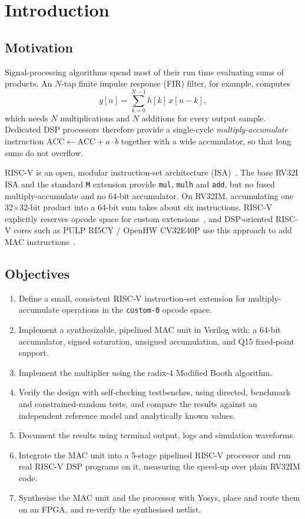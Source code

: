 \documentclass[11pt,a4paper]{report}
\newcommand{\code}[1]{\texttt{#1}}
\begin{document}
\chapter{Introduction}

\section{Motivation}
Signal-processing algorithms spend most of their run time evaluating sums of
products. An $N$-tap finite impulse response (FIR) filter, for example,
computes
\begin{equation}
  y[n] = \sum_{k=0}^{N-1} h[k]\,x[n-k],
  \label{eq:fir}
\end{equation}
which needs $N$ multiplications and $N$ additions for every output sample.
Dedicated DSP processors therefore provide a single-cycle
\emph{multiply-accumulate} instruction $\mathrm{ACC} \leftarrow \mathrm{ACC} + a\cdot b$
together with a wide accumulator, so that long sums do not overflow.

RISC-V is an open, modular instruction-set architecture (ISA)~\cite{riscv}.
The base RV32I ISA and the standard \code{M} extension provide \code{mul},
\code{mulh} and \code{add}, but no fused multiply-accumulate and no 64-bit
accumulator. On RV32IM, accumulating one 32$\times$32-bit product into a
64-bit sum takes about six instructions. RISC-V explicitly reserves opcode
space for custom extensions~\cite{riscv}, and DSP-oriented RISC-V cores such
as PULP RI5CY / OpenHW CV32E40P use this approach to add MAC
instructions~\cite{gautschi,cv32e40p}.

\section{Objectives}
\begin{enumerate}
  \item Define a small, consistent RISC-V instruction-set extension for
        multiply-accumulate operations in the \code{custom-0} opcode space.
  \item Implement a synthesizable, pipelined MAC unit in Verilog with:
        a 64-bit accumulator, signed saturation, unsigned accumulation, and
        Q15 fixed-point support.
  \item Implement the multiplier using the radix-4 Modified Booth algorithm.
  \item Verify the design with self-checking testbenches, using directed,
        benchmark and constrained-random tests, and compare the results
        against an independent reference model and analytically known values.
  \item Document the results using terminal output, logs and simulation
        waveforms.
  \item Integrate the MAC unit into a 5-stage pipelined RISC-V processor and
        run real RISC-V DSP programs on it, measuring the speed-up over
        plain RV32IM code.
  \item Synthesise the MAC unit and the processor with Yosys, place and route
        them on an FPGA, and re-verify the synthesised netlist.
\end{enumerate}
\end{document}
